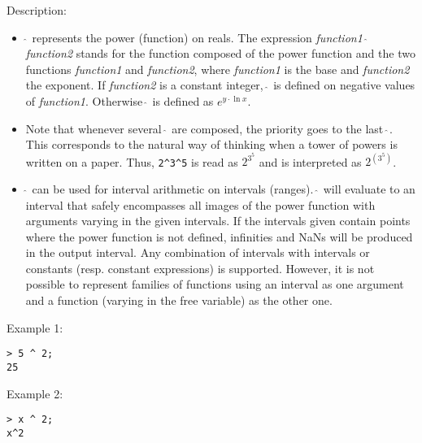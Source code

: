 \noindent Description: \begin{itemize}

\item \textbf{$\mathbf{\hat{~}}$} represents the power (function) on reals. 
   The expression \emph{function1} \textbf{$\mathbf{\hat{~}}$} \emph{function2} stands for
   the function composed of the power function and the two
   functions \emph{function1} and \emph{function2}, where \emph{function1} is
   the base and \emph{function2} the exponent.
   If \emph{function2} is a constant integer, \textbf{$\mathbf{\hat{~}}$} is defined
   on negative values of \emph{function1}. Otherwise \textbf{$\mathbf{\hat{~}}$}
   is defined as $e^{y \cdot \ln x}$.

\item Note that whenever several \textbf{$\mathbf{\hat{~}}$} are composed, the priority goes
   to the last \textbf{$\mathbf{\hat{~}}$}. This corresponds to the natural way of
   thinking when a tower of powers is written on a paper.
   Thus, \verb|2^3^5| is read as $2^{3^5}$ and is interpreted as $2^{(3^5)}$.

\item \textbf{$\mathbf{\hat{~}}$} can be used for interval arithmetic on intervals
   (ranges). \textbf{$\mathbf{\hat{~}}$} will evaluate to an interval that safely
   encompasses all images of the power function with arguments
   varying in the given intervals. If the intervals given contain points
   where the power function is not defined, infinities and NaNs will be
   produced in the output interval.  Any combination of intervals with
   intervals or constants (resp. constant expressions) is
   supported. However, it is not possible to represent families of
   functions using an interval as one argument and a function (varying in
   the free variable) as the other one.
\end{itemize}
\noindent Example 1: 
\begin{center}\begin{minipage}{15cm}\begin{Verbatim}[frame=single]
> 5 ^ 2;
25
\end{Verbatim}
\end{minipage}\end{center}
\noindent Example 2: 
\begin{center}\begin{minipage}{15cm}\begin{Verbatim}[frame=single]
> x ^ 2;
x^2
\end{Verbatim}
\end{minipage}\end{center}
